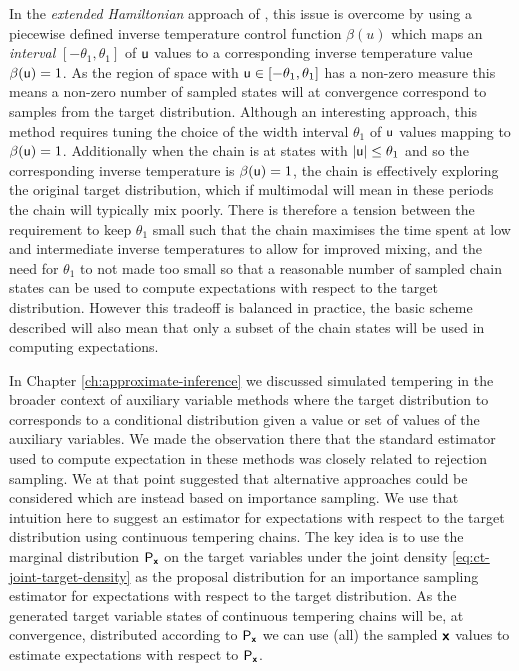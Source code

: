 In the \emph{extended Hamiltonian} approach of \citep{gobbo2015extended}, this issue is overcome by using a piecewise defined inverse temperature control function $\beta(u)$ which maps an \emph{interval} $[-\theta_1,\theta_1]$ of $\mathsf{u}$ values to a corresponding inverse temperature value $\beta(\mathsf{u}) = 1$. As the region of space with $\mathsf{u} \in [-\theta_1,\theta_1]$ has a non-zero measure this means a non-zero number of sampled states will at convergence correspond to samples from the target distribution. Although an interesting approach, this method requires tuning the choice of the width interval $\theta_1$ of $\mathsf{u}$ values mapping to $\beta(\mathsf{u}) = 1$. Additionally when the chain is at states with $|\mathsf{u}| \leq \theta_1$ and so the corresponding inverse temperature is $\beta(\mathsf{u})=1$, the chain is effectively exploring the original target distribution, which if multimodal will mean in these periods the chain will typically mix poorly. There is therefore a tension between the requirement to keep $\theta_1$ small such that the chain maximises the time spent at low and intermediate inverse temperatures to allow for improved mixing, and the need for $\theta_1$ to not made too small so that a reasonable number of sampled chain states can be used to compute expectations with respect to the target distribution. However this tradeoff is balanced in practice, the basic scheme described will also mean that only a subset of the chain states will be used in computing expectations.

In Chapter \ref{ch:approximate-inference} we discussed simulated tempering in the broader context of auxiliary variable methods where the target distribution to corresponds to a conditional distribution given a value or set of values of the auxiliary variables. We made the observation there that the standard estimator used to compute expectation in these methods was closely related to rejection sampling. We at that point suggested that alternative approaches could be considered which are instead based on importance sampling. We use that intuition here to suggest an estimator for expectations with respect to the target distribution using continuous tempering chains. The key idea is to use the marginal distribution $\mathsf{P}_{\boldsymbol{\mathsf{x}}}$ on the target variables under the joint density \eqref{eq:ct-joint-target-density} as the proposal distribution for an importance sampling estimator for expectations with respect to the target distribution. As the generated target variable states of continuous tempering chains will be, at convergence, distributed according to $\mathsf{P}_{\boldsymbol{\mathsf{x}}}$ we can use (all) the sampled $\boldsymbol{\mathsf{x}}$ values to estimate expectations with respect to $\mathsf{P}_{\boldsymbol{\mathsf{x}}}$.

